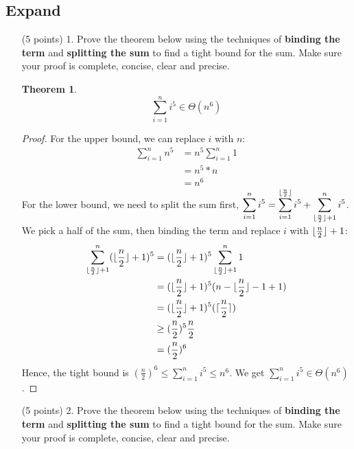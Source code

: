 \documentclass[paper=a4, fontsize=11pt]{scrartcl}
\DeclarePairedDelimiter\floor{\lfloor}{\rfloor}
\DeclarePairedDelimiter\ceil{\lceil}{\rceil}
\newtheorem{theorem}{Theorem}
\numberwithin{equation}{section}		%
\numberwithin{figure}{section}			%
\numberwithin{table}{section}				%
\begin{document}
\newpage
\subsection{Expand}

\begin{enumerate}

\item [(5 points) 1.] Prove the theorem below using the techniques of \textbf{binding the term} and \textbf{splitting the sum} to find a tight bound for the sum.  Make sure your proof is complete, concise, clear and precise.

\begin{theorem}
\[
\sum_{i=1}^{n}i^5 \in \Theta\left(n^{6}\right)
\]
\end{theorem}
\begin{proof}
	For the upper bound, we can replace $i$ with $n$:
	\begin{align*}
		\sum_{i=1}^{n}n^5 &= n^5 \sum_{i=1}^{n} 1 \\
		&= n^5 *n \\
		&= n^6
	\end{align*}
	For the lower bound, we need to split the sum first, $\displaystyle\sum_{i=1}^{n}i^5 = \displaystyle\sum_{i=1}^{\floor{\frac{n}{2}}}i^5 + \displaystyle\sum_{\floor{\frac{n}{2}} + 1}^{n}i^5$. We pick a half of the sum, then binding the term and replace $i$ with $\floor{\frac{n}{2}} + 1$:
	\begin{align*}
		\sum_{\floor{\frac{n}{2}} + 1}^{n}(\floor{\frac{n}{2}} + 1)^5 &= (\floor{\frac{n}{2}} + 1)^5 \sum_{\floor{\frac{n}{2}} + 1}^{n} 1 \\
		&= (\floor{\frac{n}{2}} + 1)^5 (n-\floor{\frac{n}{2}} - 1 + 1) \\
		&= (\floor{\frac{n}{2}} + 1)^5 (\ceil{\frac{n}{2}}) \\
		&\geq (\frac{n}{2})^5 \frac{n}{2} \\
		&= (\frac{n}{2})^6
	\end{align*}
	Hence, the tight bound is $(\frac{n}{2})^6 \leq \displaystyle\sum_{i=1}^{n}i^5 \leq n^6$. We get $\displaystyle\sum_{i=1}^{n}i^5 \in \Theta\left(n^{6}\right)$.
\end{proof}


\item [(5 points) 2.] Prove the theorem below using the techniques of \textbf{binding the term} and \textbf{splitting the sum} to find a tight bound for the sum.  Make sure your proof is complete, concise, clear and precise.


\end{enumerate}
\end{document}
